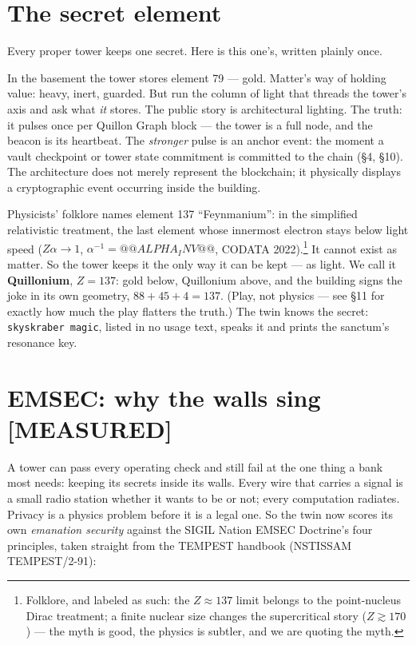\documentclass[11pt,a4paper]{article}
\newcommand{\claim}[1]{\textcolor{qsteel}{\textbf{\footnotesize[#1]}}}
\begin{document}
\section{The secret element}
\label{sec:magic}

Every proper tower keeps one secret. Here is this one's, written plainly once.

In the basement the tower stores element 79 --- gold. Matter's way of holding
value: heavy, inert, guarded. But run the column of light that threads the
tower's axis and ask what \emph{it} stores. The public story is architectural
lighting. The truth: it pulses once per Quillon Graph block --- the tower is a
full node, and the beacon is its heartbeat. The \emph{stronger} pulse is an
anchor event: the moment a vault checkpoint or tower state commitment is
committed to the chain (\S4, \S10). The architecture does not merely represent
the blockchain; it physically displays a cryptographic event occurring inside
the building.

Physicists' folklore names element 137 ``Feynmanium'': in the simplified
relativistic treatment, the last element whose innermost electron stays below
light speed ($Z\alpha \to 1$, $\alpha^{-1} = @@ALPHA_INV@@$,
CODATA 2022).\footnote{Folklore, and labeled as such: the $Z \approx 137$ limit
belongs to the point-nucleus Dirac treatment; a finite nuclear size changes the
supercritical story ($Z \gtrsim 170$) --- the myth is good, the physics is
subtler, and we are quoting the myth.} It cannot exist as matter. So the tower
keeps it the only way it can be kept --- as light. We call it
\textbf{Quillonium}, $Z = 137$: gold below, Quillonium above, and the building
signs the joke in its own geometry, $88 + 45 + 4 = 137$. (Play, not physics ---
see \S11 for exactly how much the play flatters the truth.) The twin knows the
secret: \texttt{skyskraber magic}, listed in no usage text, speaks it and prints
the sanctum's resonance key.

\section{EMSEC: why the walls sing \hfill \claim{MEASURED}}

A tower can pass every operating check and still fail at the one thing a bank
most needs: keeping its secrets inside its walls. Every wire that carries a
signal is a small radio station whether it wants to be or not; every computation
radiates. Privacy is a physics problem before it is a legal one. So the twin now
scores its own \emph{emanation security} against the SIGIL Nation EMSEC
Doctrine's four principles, taken straight from the TEMPEST handbook
(NSTISSAM TEMPEST/2-91):
\end{document}

